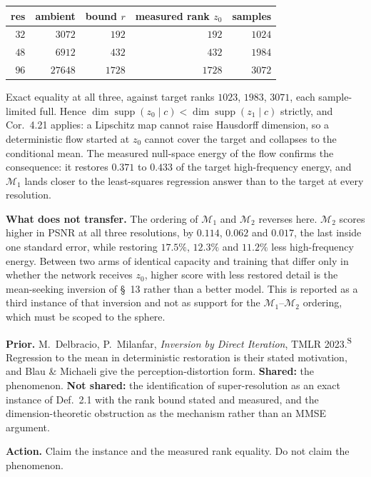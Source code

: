 \documentclass[11pt]{article}
\newcommand{\Sec}{\textsuperscript{S}}
\begin{document}
\begin{center}
\begin{tabular}{@{}rrrrr@{}}
\toprule
res & ambient & bound $r$ & measured rank $z_0$ & samples\\
\midrule
$32$ & $3072$ & $192$ & $192$ & $1024$\\
$48$ & $6912$ & $432$ & $432$ & $1984$\\
$96$ & $27648$ & $1728$ & $1728$ & $3072$\\
\bottomrule
\end{tabular}
\end{center}

Exact equality at all three, against target ranks $1023$, $1983$, $3071$, each sample-limited
full. Hence $\dim\operatorname{supp}(z_0\mid c)<\dim\operatorname{supp}(z_1\mid c)$ strictly, and
Cor.~4.21 applies: a Lipschitz map cannot raise Hausdorff dimension, so a deterministic flow
started at $z_0$ cannot cover the target and collapses to the conditional mean. The measured
null-space energy of the flow confirms the consequence: it restores $0.371$ to $0.433$ of the
target high-frequency energy, and $\mathcal M_1$ lands closer to the least-squares regression
answer than to the target at every resolution.

\textbf{What does not transfer.} The ordering of $\mathcal M_1$ and $\mathcal M_2$ reverses here.
$\mathcal M_2$ scores higher in PSNR at all three resolutions, by $0.114$, $0.062$ and $0.017$,
the last inside one standard error, while restoring $17.5\%$, $12.3\%$ and $11.2\%$ less
high-frequency energy. Between two arms of identical capacity and training that differ only in
whether the network receives $z_0$, higher score with less restored detail is the mean-seeking
inversion of \S~13 rather than a better model. This is reported as a third instance of that
inversion and not as support for the $\mathcal M_1$--$\mathcal M_2$ ordering, which must be
scoped to the sphere.

\textbf{Prior.} M.~Delbracio, P.~Milanfar, \emph{Inversion by Direct Iteration}, TMLR 2023.\Sec{}
Regression to the mean in deterministic restoration is their stated motivation, and Blau \&
Michaeli give the perception-distortion form. \textbf{Shared:} the phenomenon.
\textbf{Not shared:} the identification of super-resolution as an exact instance of Def.~2.1 with
the rank bound stated and measured, and the dimension-theoretic obstruction as the mechanism
rather than an MMSE argument.

\textbf{Action.} Claim the instance and the measured rank equality. Do not claim the phenomenon.
\end{document}
